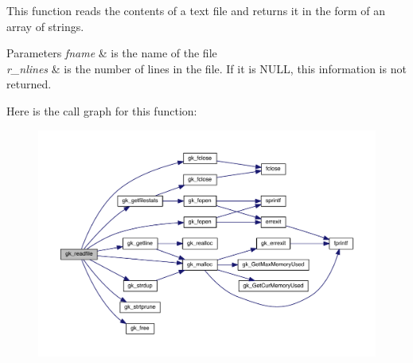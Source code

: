 This function reads the contents of a text file and returns it in the form of an array of strings. 
\begin{DoxyParams}{Parameters}
{\em fname} & is the name of the file \\
\hline
{\em r\+\_\+nlines} & is the number of lines in the file. If it is N\+U\+LL, this information is not returned. \\
\hline
\end{DoxyParams}
Here is the call graph for this function\+:\nopagebreak
\begin{figure}[H]
\begin{center}
\leavevmode
\includegraphics[width=350pt]{a00855_ad13e689608e193482a6f30b1ade87814_cgraph}
\end{center}
\end{figure}
